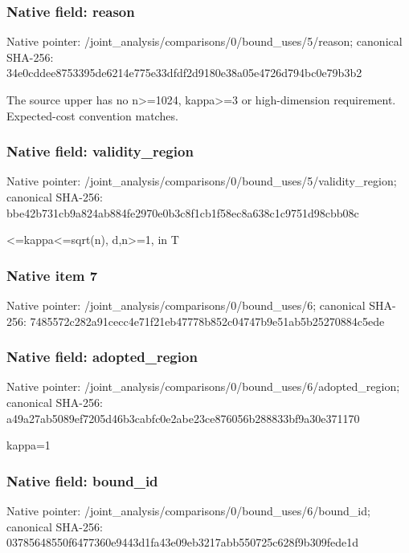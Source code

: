\documentclass[10pt,a4paper]{article}
\begin{document}
\subsubsection{Native field: reason}
Native pointer: /joint\_\allowbreak{}analysis/comparisons/0/bound\_\allowbreak{}uses/5/reason; canonical SHA-256: 34e0cddee8753395de6214e775e33dfdf2d9180e38a05e4726d794bc0e79b3b2

\begingroup\raggedright\sloppy The source upper has no n>=\allowbreak{}1024,\allowbreak{} kappa>=\allowbreak{}3 or high-dimension requirement. Expected-cost convention matches.\par\endgroup

\subsubsection{Native field: validity\_\allowbreak{}region}
Native pointer: /joint\_\allowbreak{}analysis/comparisons/0/bound\_\allowbreak{}uses/5/validity\_\allowbreak{}region; canonical SHA-256: bbe42b731cb9a824ab884fe2970e0b3c8f1cb1f58ec8a638c1c9751d98cbb08c

\begingroup\raggedright{}<=\allowbreak{}kappa<=\allowbreak{}sqrt(n),\allowbreak{} d,\allowbreak{}n>=\allowbreak{}1,\allowbreak{} in T\par\endgroup

\subsubsection{Native item 7}
Native pointer: /joint\_\allowbreak{}analysis/comparisons/0/bound\_\allowbreak{}uses/6; canonical SHA-256: 7485572c282a91cecc4e71f21eb47778b852c04747b9e51ab5b25270884c5ede

\subsubsection{Native field: adopted\_\allowbreak{}region}
Native pointer: /joint\_\allowbreak{}analysis/comparisons/0/bound\_\allowbreak{}uses/6/adopted\_\allowbreak{}region; canonical SHA-256: a49a27ab5089ef7205d46b3cabfc0e2abe23ce876056b288833bf9a30e371170

\begingroup\raggedright\sloppy kappa=\allowbreak{}1\par\endgroup

\subsubsection{Native field: bound\_\allowbreak{}id}
Native pointer: /joint\_\allowbreak{}analysis/comparisons/0/bound\_\allowbreak{}uses/6/bound\_\allowbreak{}id; canonical SHA-256: 03785648550f6477360e9443d1fa43e09eb3217abb550725c628f9b309fede1d
\end{document}
